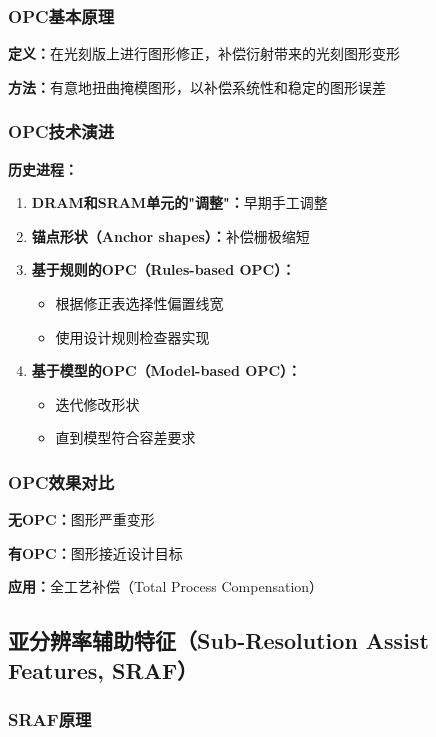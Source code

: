 \documentclass[UTF8,12pt,a4paper]{ctexart}
\begin{document}
\subsubsection{OPC基本原理}

\textbf{定义：}在光刻版上进行图形修正，补偿衍射带来的光刻图形变形

\textbf{方法：}有意地扭曲掩模图形，以补偿系统性和稳定的图形误差

\subsubsection{OPC技术演进}

\textbf{历史进程：}
\begin{enumerate}
    \item \textbf{DRAM和SRAM单元的"调整"：}早期手工调整
    \item \textbf{锚点形状（Anchor shapes）：}补偿栅极缩短
    \item \textbf{基于规则的OPC（Rules-based OPC）：}
    \begin{itemize}
        \item 根据修正表选择性偏置线宽
        \item 使用设计规则检查器实现
    \end{itemize}
    \item \textbf{基于模型的OPC（Model-based OPC）：}
    \begin{itemize}
        \item 迭代修改形状
        \item 直到模型符合容差要求
    \end{itemize}
\end{enumerate}

\subsubsection{OPC效果对比}

\textbf{无OPC：}图形严重变形

\textbf{有OPC：}图形接近设计目标

\textbf{应用：}全工艺补偿（Total Process Compensation）

\subsection{亚分辨率辅助特征（Sub-Resolution Assist Features, SRAF）}

\subsubsection{SRAF原理}
\end{document}
